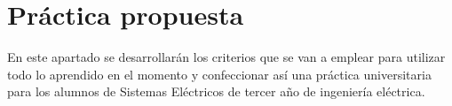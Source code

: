 \section{Práctica propuesta}
\label{sec:practica}

En este apartado se desarrollarán los criterios que se van a emplear para utilizar todo lo aprendido en el momento y confeccionar así una práctica universitaria para los alumnos de Sistemas Eléctricos de tercer año de ingeniería eléctrica.